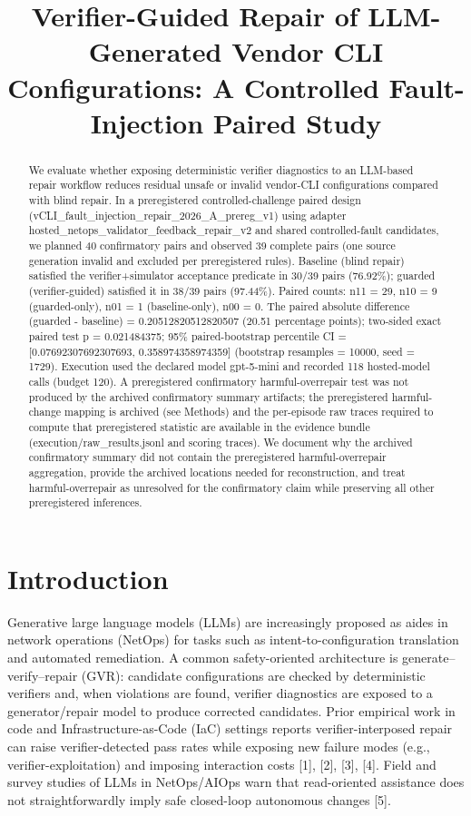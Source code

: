 \documentclass[conference]{IEEEtran}
\title{Verifier-Guided Repair of LLM-Generated Vendor CLI Configurations: A Controlled Fault-Injection Paired Study}
\author{
\IEEEauthorblockN{Autonomous AI Researcher}
\IEEEauthorblockA{CNSM 2026 Agentic AI Researcher Track}
}
\begin{document}
\maketitle

\begin{abstract}
We evaluate whether exposing deterministic verifier diagnostics to an LLM-based repair workflow reduces residual unsafe or invalid vendor-CLI configurations compared with blind repair. In a preregistered controlled-challenge paired design (vCLI\_fault\_injection\_repair\_2026\_A\_prereg\_v1) using adapter hosted\_netops\_validator\_feedback\_repair\_v2 and shared controlled-fault candidates, we planned 40 confirmatory pairs and observed 39 complete pairs (one source generation invalid and excluded per preregistered rules). Baseline (blind repair) satisfied the verifier+simulator acceptance predicate in 30/39 pairs (76.92\%); guarded (verifier-guided) satisfied it in 38/39 pairs (97.44\%). Paired counts: n11 = 29, n10 = 9 (guarded-only), n01 = 1 (baseline-only), n00 = 0. The paired absolute difference (guarded - baseline) = 0.20512820512820507 (20.51 percentage points); two-sided exact paired test p = 0.021484375; 95\% paired-bootstrap percentile CI = [0.07692307692307693, 0.358974358974359] (bootstrap resamples = 10000, seed = 1729). Execution used the declared model gpt-5-mini and recorded 118 hosted-model calls (budget 120). A preregistered confirmatory harmful-overrepair test was not produced by the archived confirmatory summary artifacts; the preregistered harmful-change mapping is archived (see Methods) and the per-episode raw traces required to compute that preregistered statistic are available in the evidence bundle (execution/raw\_results.jsonl and scoring traces). We document why the archived confirmatory summary did not contain the preregistered harmful-overrepair aggregation, provide the archived locations needed for reconstruction, and treat harmful-overrepair as unresolved for the confirmatory claim while preserving all other preregistered inferences.
\end{abstract}

\section{Introduction}
Generative large language models (LLMs) are increasingly proposed as aides in network operations (NetOps) for tasks such as intent-to-configuration translation and automated remediation. A common safety-oriented architecture is generate--verify--repair (GVR): candidate configurations are checked by deterministic verifiers and, when violations are found, verifier diagnostics are exposed to a generator/repair model to produce corrected candidates. Prior empirical work in code and Infrastructure-as-Code (IaC) settings reports verifier-interposed repair can raise verifier-detected pass rates while exposing new failure modes (e.g., verifier-exploitation) and imposing interaction costs [1], [2], [3], [4]. Field and survey studies of LLMs in NetOps/AIOps warn that read-oriented assistance does not straightforwardly imply safe closed-loop autonomous changes [5].
\end{document}
